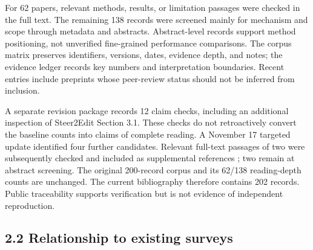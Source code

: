 For 62 papers, relevant methods, results, or limitation passages were checked in the full text. The remaining 138 records were screened mainly for mechanism and scope through metadata and abstracts. Abstract-level records support method positioning, not unverified fine-grained performance comparisons. The corpus matrix preserves identifiers, versions, dates, evidence depth, and notes; the evidence ledger records key numbers and interpretation boundaries. Recent entries include preprints whose peer-review status should not be inferred from inclusion.


A separate revision package records 12 claim checks, including an additional inspection of Steer2Edit Section 3.1. These checks do not retroactively convert the baseline counts into claims of complete reading. A November 17 targeted update identified four further candidates. Relevant full-text passages of two were subsequently checked and included as supplemental references \cite{r201,r202}; two remain at abstract screening. The original 200-record corpus and its 62/138 reading-depth counts are unchanged. The current bibliography therefore contains 202 records. Public traceability supports verification but is not evidence of independent reproduction.


\subsection*{2.2 Relationship to existing surveys}

\begingroup\small\setlength{\tabcolsep}{5pt}\renewcommand{\arraystretch}{1.18}


